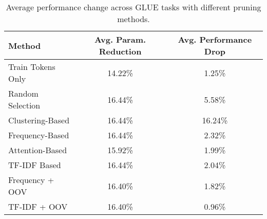 \documentclass[twocolumn]{article}
\begin{document}
\begin{table}[ht!]
\centering
\caption{Average performance change across GLUE tasks with different pruning methods.}
\label{tab:avg_performance}
\begin{tabular}{lcc}
\toprule
\textbf{Method} & \textbf{Avg. Param. Reduction} & \textbf{Avg. Performance Drop} \\
\midrule
Train Tokens Only & 14.22\% & 1.25\% \\
Random Selection & 16.44\% & 5.58\% \\
Clustering-Based & 16.44\% & 16.24\% \\
Frequency-Based & 16.44\% & 2.32\% \\
Attention-Based & 15.92\% & 1.99\% \\
TF-IDF Based & 16.44\% & 2.04\% \\
Frequency + OOV & 16.40\% & 1.82\% \\
TF-IDF + OOV & 16.40\% & 0.96\% \\
\bottomrule
\end{tabular}
\end{table}

\newpage


\end{document}
